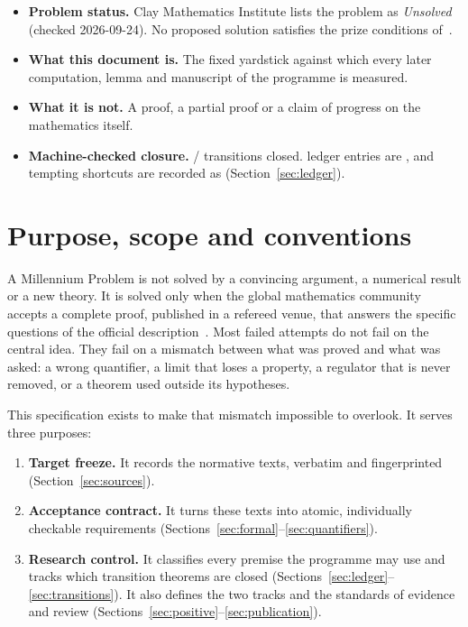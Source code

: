 \documentclass[11pt,a4paper]{article}
\begin{document}
\begin{keybox}[title=Status at a glance]
\begin{itemize}[leftmargin=1.2em]
\item \textbf{Problem status.} Clay Mathematics Institute lists the problem as \emph{Unsolved} (checked 2026-09-24). No proposed solution satisfies the prize conditions of~\cite[\S4]{CMIrules}.
\item \textbf{What this document is.} The fixed yardstick against which every later computation, lemma and manuscript of the programme is measured.
\item \textbf{What it is not.} A proof, a partial proof or a claim of progress on the mathematics itself.
\item \textbf{Machine-checked closure.} \NumClosedTransitions/\NumTransitions{} transitions closed. \NumOpenAssumptions{} ledger entries are , and \NumFalseAssumptions{} tempting shortcuts are recorded as  (Section~\ref{sec:ledger}).
\end{itemize}
\end{keybox}

\tableofcontents

\section{Purpose, scope and conventions}\label{sec:purpose}

A Millennium Problem is not solved by a convincing argument, a numerical result or a new theory. It is solved only when the global mathematics community accepts a complete proof, published in a refereed venue, that answers the specific questions of the official description~\cite[\S\S4--5, 7]{CMIrules}. Most failed attempts do not fail on the central idea. They fail on a mismatch between what was proved and what was asked: a wrong quantifier, a limit that loses a property, a regulator that is never removed, or a theorem used outside its hypotheses.

This specification exists to make that mismatch impossible to overlook. It serves three purposes:
\begin{enumerate}[label=(\roman*)]
\item \textbf{Target freeze.} It records the normative texts, verbatim and fingerprinted (Section~\ref{sec:sources}).
\item \textbf{Acceptance contract.} It turns these texts into atomic, individually checkable requirements (Sections~\ref{sec:formal}--\ref{sec:quantifiers}).
\item \textbf{Research control.} It classifies every premise the programme may use and tracks which transition theorems are closed (Sections~\ref{sec:ledger}--\ref{sec:transitions}). It also defines the two tracks and the standards of evidence and review (Sections~\ref{sec:positive}--\ref{sec:publication}).
\end{enumerate}
\end{document}
